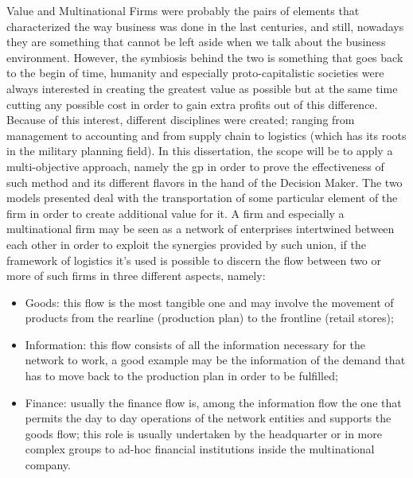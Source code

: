 \begin{doublespace}
Value and Multinational Firms were probably the pairs of elements that characterized the way business was done in the last centuries, and still, nowadays they are something that cannot be left aside when we talk about the business environment. However, the symbiosis behind the two is something that goes back to the begin of time, humanity and especially proto-capitalistic societies were always interested in creating the greatest value as possible but at the same time cutting any possible cost in order to gain extra profits out of this difference.
\\
Because of this interest, different disciplines were created; ranging from management to accounting and from supply chain to logistics (which has its roots in the military planning field). In this dissertation, the scope will be to apply a multi-objective approach, namely the \gls{gp} in order to prove the effectiveness of such method and its different flavors in the hand of the Decision Maker. The two models presented deal with the transportation of some particular element of the firm in order to create additional value for it. A firm and especially a multinational firm may be seen as a network of enterprises intertwined between each other in order to exploit the synergies provided by such union, if the framework of logistics it's used is possible to discern the flow between two or more of such firms in three different aspects, namely:

\begin{itemize}
 \item Goods: this flow is the most tangible one and may involve the movement of products from the rearline (production plan) to the frontline (retail stores);    
\item Information: this flow consists of all the information necessary for the network to work, a good example may be the information of the demand that has to move back to the production plan in order to be fulfilled;
\item Finance: usually the finance flow is, among the information flow the one that permits the day to day operations of the network entities and supports the goods flow; this role is usually undertaken by the headquarter or in more complex groups to ad-hoc financial institutions inside the multinational company. 
\end{itemize}


\end{doublespace}
